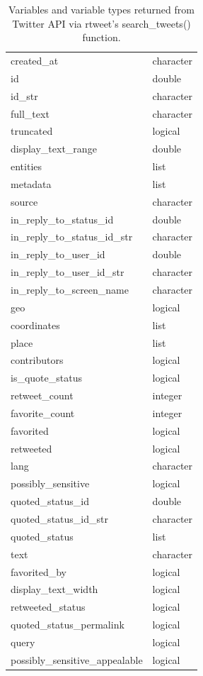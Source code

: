\documentclass[
  letterpaper,
]{scrbook}
\begin{document}
\hypertarget{tbl-ad-rtweet-variables-table}{}
\begin{table}
\caption{\label{tbl-ad-rtweet-variables-table}Variables and variable types returned from Twitter API via rtweet's
search\_tweets() function. }\tabularnewline

\centering
\begin{tabular}{ll}
\toprule
created\_at & character\\
id & double\\
id\_str & character\\
full\_text & character\\
truncated & logical\\
\addlinespace
display\_text\_range & double\\
entities & list\\
metadata & list\\
source & character\\
in\_reply\_to\_status\_id & double\\
\addlinespace
in\_reply\_to\_status\_id\_str & character\\
in\_reply\_to\_user\_id & double\\
in\_reply\_to\_user\_id\_str & character\\
in\_reply\_to\_screen\_name & character\\
geo & logical\\
\addlinespace
coordinates & list\\
place & list\\
contributors & logical\\
is\_quote\_status & logical\\
retweet\_count & integer\\
\addlinespace
favorite\_count & integer\\
favorited & logical\\
retweeted & logical\\
lang & character\\
possibly\_sensitive & logical\\
\addlinespace
quoted\_status\_id & double\\
quoted\_status\_id\_str & character\\
quoted\_status & list\\
text & character\\
favorited\_by & logical\\
\addlinespace
display\_text\_width & logical\\
retweeted\_status & logical\\
quoted\_status\_permalink & logical\\
query & logical\\
possibly\_sensitive\_appealable & logical\\
\bottomrule
\end{tabular}
\end{table}
\end{document}
